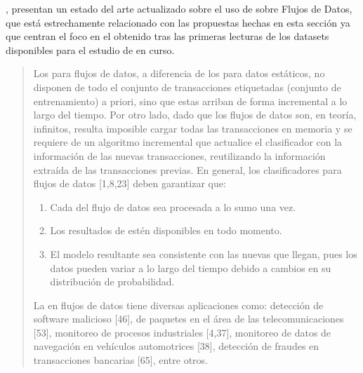 \cite{FMenaHLeonHPalancar-ClasificacionBasadaEnCARFlujosDeDatos-2013}, presentan un estado del arte actualizado sobre el uso de \CARs sobre Flujos de Datos, que está estrechamente relacionado con las propuestas hechas en esta sección ya que centran el foco en el \clasificador obtenido tras las primeras lecturas de los datasets disponibles para el estudio de \clasificacion en curso.



\begin{quote}
Los \clasificadores para flujos de datos, a diferencia de los \clasificadores para datos estáticos, no disponen de todo el conjunto de transacciones etiquetadas (conjunto de entrenamiento) a priori, sino que estas arriban de forma incremental a lo largo del tiempo. Por otro lado, dado que los flujos de datos son, en teoría, infinitos, resulta imposible cargar todas las transacciones en memoria y se requiere de un algoritmo incremental que actualice el clasificador con la información de las nuevas transacciones, reutilizando la información extraída de las transacciones previas. En general, los clasificadores para flujos de datos [1,8,23] deben garantizar que:

\begin{enumerate}
  \item Cada \transaccion del flujo de datos sea procesada a lo sumo una vez.
  \item Los resultados de \clasificacion estén disponibles en todo momento.
  \item El modelo resultante sea consistente con las nuevas \transacciones que llegan, pues los datos pueden variar a lo largo del tiempo debido a cambios en su distribución de probabilidad.
\end{enumerate}

La \clasificacion en flujos de datos tiene diversas aplicaciones como: detección de software malicioso [46], \clasificacion de paquetes en el área de las telecomunicaciones [53], monitoreo de procesos industriales [4,37], monitoreo de datos de navegación en vehículos automotrices [38], detección de fraudes en transacciones bancarias [65], entre otros.


\end{quote}
